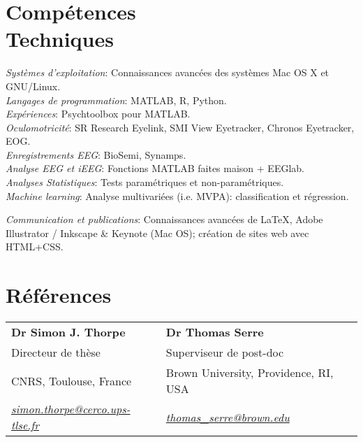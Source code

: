 \documentclass[margin,line]{resume}
\begin{document}
\begin{resume}
\vspace{3mm}
\section{\mysidestyle Compétences\\Techniques}
	\textsl{Systèmes d'exploitation}: Connaissances avancées des systèmes Mac OS X et GNU/Linux.\\
	\textsl{Langages de programmation}: MATLAB, R, Python.\\
	\textsl{Expériences}: Psychtoolbox pour MATLAB.\\
	\textsl{Oculomotricité}: SR Research Eyelink, SMI View Eyetracker, Chronos Eyetracker, EOG.\\
	\textsl{Enregistrements EEG}: BioSemi, Synamps.\\
	\textsl{Analyse EEG et iEEG}: Fonctions MATLAB faites maison + EEGlab.\\
	\textsl{Analyses Statistiques}: Tests paramétriques et non-paramétriques.\\
	\textsl{Machine learning}: Analyse multivariées (i.e. MVPA): classification et régression.\\
	
\newpage

	\textsl{Communication et publications}: Connaissances avancées de \LaTeX, Adobe Illustrator / Inkscape \& Keynote (Mac OS); création de sites web avec HTML+CSS.


\vspace{3mm}
\section{\mysidestyle Références} 

	\begin{tabular}{@{}p{6cm}p{6cm}}
	\textbf{Dr Simon J. Thorpe}       &  \textbf{Dr Thomas Serre}                   \\
	Directeur de thèse                              &  Superviseur de post-doc                       \\
	CNRS, Toulouse, France          &  Brown University, Providence, RI, USA        \\
	\textsl{\href{mailto:simon.thorpe@cerco.ups-tlse.fr}{simon.thorpe@cerco.ups-tlse.fr}}   &  
	\textsl{\href{mailto:thomas_serre@brown.edu}{thomas\_serre@brown.edu}}    \\
	\end{tabular}
	

\end{resume}
\end{document}

